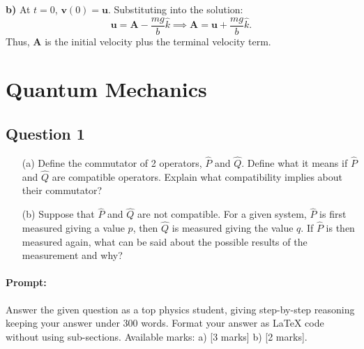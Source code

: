 \documentclass{article}
\begin{document}
\textbf{b)} At \( t = 0 \), \( \mathbf{v}(0) = \mathbf{u} \). Substituting into the solution:  
\[
\mathbf{u} = \mathbf{A} - \frac{mg}{b} \hat{k} \implies \mathbf{A} = \mathbf{u} + \frac{mg}{b} \hat{k}.
\]  
Thus, \( \mathbf{A} \) is the initial velocity plus the terminal velocity term.  



\section{Quantum Mechanics}

\subsection{Question 1}

\begin{enumerate}
    \item[(a)] Define the commutator of 2 operators, $\hat{P}$ and $\hat{Q}$. Define what it means if $\hat{P}$ and $\hat{Q}$ are compatible operators. Explain what compatibility implies about their commutator?
    \item[(b)] Suppose that $\hat{P}$ and $\hat{Q}$ are not compatible. For a given system, $\hat{P}$ is first measured giving a value $p$, then $\hat{Q}$ is measured giving the value $q$. If $\hat{P}$ is then measured again, what can be said about the possible results of the measurement and why?
\end{enumerate}

\paragraph{Prompt: \\} 
Answer the given question as a top physics student, giving step-by-step reasoning keeping your answer under 300 words. Format your answer as LaTeX code without using sub-sections. Available marks: a) [3 marks] b) [2 marks].
\end{document}
